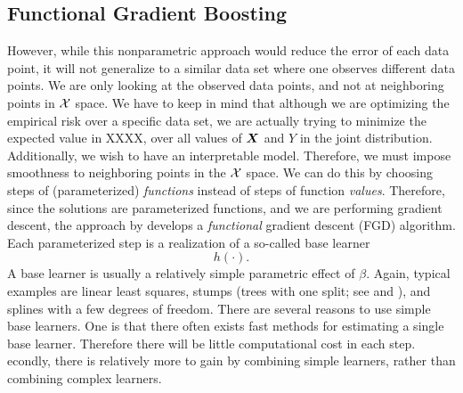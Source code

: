 \subsection{Functional Gradient Boosting}\label{sec:FGD}
However, while this nonparametric approach would reduce the error of each data point, it will not generalize to a similar data set where one observes different data points.
We are only looking at the observed data points, and not at neighboring points in $\mathcal{X}$ space.
We have to keep in mind that although we are optimizing the empirical risk over a specific data set,
we are actually trying to minimize the expected value in XXXX, over all values of $\bm{X}$ and $Y$ in the joint distribution.
Additionally, we wish to have an interpretable model.
Therefore, we must impose smoothness to neighboring points in the $\mathcal{X}$ space. We can do this by choosing steps of
(parameterized) \textit{functions} instead of steps of function \textit{values}.
Therefore, since the solutions are parameterized functions, and we are performing gradient descent,
the approach by \citet{friedman2001} develops a \textit{functional} gradient descent (FGD) algorithm.
Each parameterized step is a realization of a so-called base learner
\begin{equation*}
    h(\cdot).
\end{equation*}
A base learner is usually a relatively simple parametric effect of $\beta$.
Again, typical examples are linear least squares, stumps (trees with one split; see \citet{buhlmann2007} and \citet{ESL}), and splines with a few degrees of freedom.
There are several reasons to use simple base learners.
One is that there often exists fast methods for estimating a single base learner.
Therefore there will be little computational cost in each step. 
econdly, there is relatively more to gain by combining simple learners,
rather than combining complex learners.

